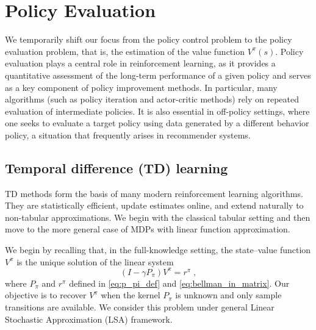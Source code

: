 \documentclass{article}
\numberwithin{equation}{section}
\newcommand{\eqsp}{\;}
\def\rp{r^\pi}
\begin{document}
\section{Policy Evaluation}\label{sec5}
We temporarily shift our focus from the policy control problem to the policy evaluation problem, 
that is, the estimation of the value function \(
V^{\pi}(s)\).
Policy evaluation plays a central role in reinforcement learning, as it provides
a quantitative assessment of the long-term performance of a given policy and
serves as a key component of policy improvement methods. In particular, many
algorithms (such as policy iteration and actor-critic methods) rely on repeated
evaluation of intermediate policies. It is also essential in off-policy settings,
where one seeks to evaluate a target policy using data generated by a different
behavior policy, a situation that frequently arises in recommender systems.

\subsection{Temporal difference (TD) learning}
TD methods form the basis of many modern reinforcement learning algorithms. 
They are statistically efficient, update estimates online, and extend naturally to 
non-tabular approximations. We begin with the classical tabular setting and then move to the more general case of MDPs with linear function approximation.


We begin by recalling that, in the full-knowledge setting, the state–value function \(V^\pi\) is  the unique solution of the linear system
\begin{equation}
\label{eq:consistency_equation}
(I-\gamma P_{\pi})V^\pi = \rp\eqsp,
\end{equation}
where \(P_\pi\) and \(\rp\) defined in \eqref{eq:p_pi_def} and \eqref{eq:bellman_in_matrix}.
Our objective is to recover \(V^{\pi}\) when the kernel \(P_{\pi}\) is unknown and only sample transitions are available. We consider this problem under general Linear Stochastic Approximation (LSA) framework.
\end{document}
